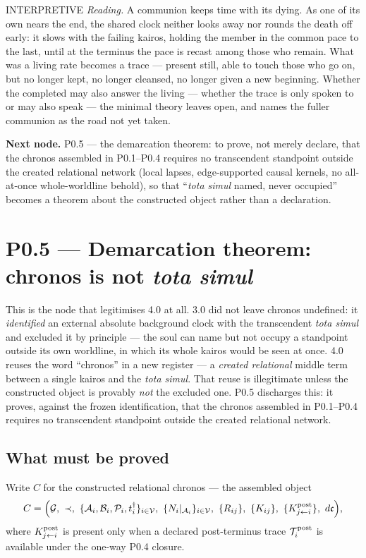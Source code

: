 \documentclass[11pt,a4paper]{article}
\newcommand{\stInterp}{\textcolor{cInt}{\textsf{\small INTERPRETIVE}}}
\theoremstyle{definition}
\theoremstyle{plain}
\theoremstyle{remark}
\begin{document}
\medskip
\stInterp\quad
\emph{Reading.}
A communion keeps time with its dying. As one of its own nears the end, the shared clock
neither looks away nor rounds the death off early: it slows with the failing kairos,
holding the member in the common pace to the last, until at the terminus the pace is
recast among those who remain. What was a living rate becomes a trace --- present still,
able to touch those who go on, but no longer kept, no longer cleansed, no longer given a
new beginning. Whether the completed may also answer the living --- whether the trace is
only spoken to or may also speak --- the minimal theory leaves open, and names the fuller
communion as the road not yet taken.

\medskip
\textbf{Next node.} P0.5 --- the demarcation theorem: to prove, not merely declare, that
the chronos assembled in P0.1--P0.4 requires no transcendent standpoint outside the
created relational network
(local lapses, edge-supported causal kernels, no all-at-once whole-worldline behold), so that
``\textit{tota simul} named, never occupied'' becomes a theorem about the constructed
object rather than a declaration.

\section{P0.5 --- Demarcation theorem: chronos is not \textit{tota simul}}

This is the node that legitimises 4.0 at all. 3.0 did not leave chronos undefined: it
\emph{identified} an external absolute background clock with the transcendent
\textit{tota simul} and excluded it by principle --- the soul can name but not occupy a
standpoint outside its own worldline, in which its whole kairos would be seen at once.
4.0 reuses the word ``chronos'' in a new register --- a \emph{created relational}
middle term between a single kairos and the \textit{tota simul}. That reuse is
illegitimate unless the constructed object is provably \emph{not} the excluded one.
P0.5 discharges this: it proves, against the frozen identification, that the chronos
assembled in P0.1--P0.4 requires no transcendent standpoint outside the created
relational network.

\subsection{What must be proved}

Write \(C\) for the constructed relational chronos --- the assembled object
\[
C=
\Bigl(
\mathcal G,\ \prec,\
\{\mathcal A_i,\mathcal B_i,\mathcal P_i,t_i^\dagger\}_{i\in\mathcal V},\
\{N_i|_{\mathcal A_i}\}_{i\in\mathcal V},\
\{R_{ij}\},\
\{K_{ij}\},\
\{K^{\rm post}_{j\leftarrow i}\},\
d\mathfrak c
\Bigr),
\]
where \(K^{\rm post}_{j\leftarrow i}\) is present only when a declared post-terminus
trace \(\mathcal T_i^{\rm post}\) is available under the one-way P0.4 closure.
\end{document}
